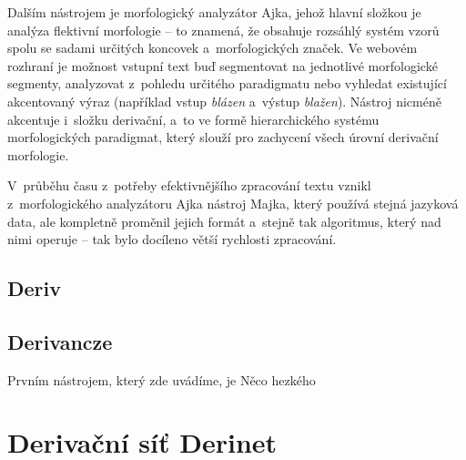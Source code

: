 Dalším nástrojem je morfologický analyzátor Ajka, jehož hlavní složkou
je analýza flektivní morfologie -- to znamená, že obsahuje rozsáhlý
systém vzorů spolu se sadami určitých koncovek a~morfologických značek.
Ve webovém rozhraní je možnost vstupní text buď segmentovat na
jednotlivé morfologické segmenty, analyzovat z~pohledu určitého
paradigmatu nebo vyhledat existující akcentovaný výraz (například vstup
\emph{blázen} a~výstup \emph{blažen}). Nástroj nicméně akcentuje
i~složku derivační, a~to ve formě hierarchického systému morfologických
paradigmat, který slouží pro zachycení všech úrovní derivační
morfologie.~\parencite{ajka}

V~průběhu času z~potřeby efektivnějšího zpracování textu vznikl
z~morfologického analyzátoru Ajka nástroj Majka, který používá stejná
jazyková data, ale kompletně proměnil jejich formát a~stejně tak
algoritmus, který nad nimi operuje -- tak bylo docíleno větší rychlosti
zpracování.~\parencite{majka}

\hypertarget{deriv}{%
\subsection{Deriv}\label{deriv}}

\hypertarget{derivancze}{%
\subsection{Derivancze}\label{derivancze}}

Prvním nástrojem, který zde uvádíme, je Něco hezkého
\parencite[516]{pala15}

\hypertarget{derivaux10dnuxed-suxedux165-derinet}{%
\section{Derivační síť
Derinet}\label{derivaux10dnuxed-suxedux165-derinet}}
